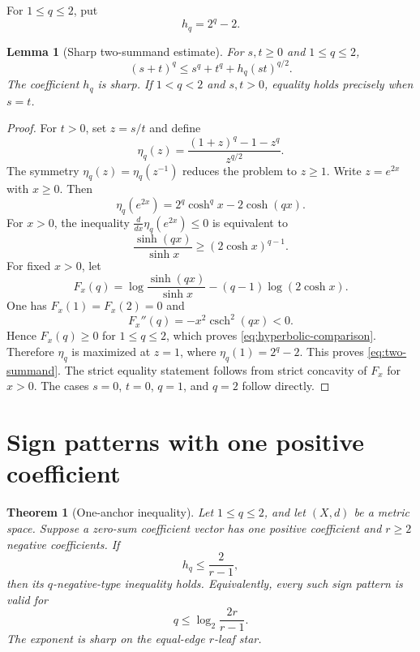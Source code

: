 \documentclass[11pt]{amsart}
\newtheorem{theorem}{Theorem}[section]
\newtheorem{lemma}[lemma]{Lemma}
\theoremstyle{definition}
\theoremstyle{remark}
\begin{document}
For $1\le q\le2$, put
\[
 h_q=2^q-2.
\]

\begin{lemma}[Sharp two-summand estimate]\label{lem:two-summand}
For $s,t\ge0$ and $1\le q\le2$,
\begin{equation}\label{eq:two-summand}
 (s+t)^q\le s^q+t^q+h_q(st)^{q/2}.
\end{equation}
The coefficient $h_q$ is sharp. If $1<q<2$ and $s,t>0$, equality holds precisely when $s=t$.
\end{lemma}

\begin{proof}
For $t>0$, set $z=s/t$ and define
\[
 \eta_q(z)=\frac{(1+z)^q-1-z^q}{z^{q/2}}.
\]
The symmetry $\eta_q(z)=\eta_q(z^{-1})$ reduces the problem to $z\ge1$. Write $z=e^{2x}$ with $x\ge0$. Then
\[
 \eta_q(e^{2x})=2^q\cosh^q x-2\cosh(qx).
\]
For $x>0$, the inequality $\frac{d}{dx}\eta_q(e^{2x})\le0$ is equivalent to
\begin{equation}\label{eq:hyperbolic-comparison}
 \frac{\sinh(qx)}{\sinh x}\ge(2\cosh x)^{q-1}.
\end{equation}
For fixed $x>0$, let
\[
 F_x(q)=\log\frac{\sinh(qx)}{\sinh x}-(q-1)\log(2\cosh x).
\]
One has $F_x(1)=F_x(2)=0$ and
\[
 F_x''(q)=-x^2\operatorname{csch}^2(qx)<0.
\]
Hence $F_x(q)\ge0$ for $1\le q\le2$, which proves \eqref{eq:hyperbolic-comparison}. Therefore $\eta_q$ is maximized at $z=1$, where $\eta_q(1)=2^q-2$. This proves \eqref{eq:two-summand}. The strict equality statement follows from strict concavity of $F_x$ for $x>0$. The cases $s=0$, $t=0$, $q=1$, and $q=2$ follow directly.
\end{proof}

\section{Sign patterns with one positive coefficient}

\begin{theorem}[One-anchor inequality]\label{thm:one-anchor}
Let $1\le q\le2$, and let $(X,d)$ be a metric space. Suppose a zero-sum coefficient vector has one positive coefficient and $r\ge2$ negative coefficients. If
\begin{equation}\label{eq:one-condition}
 h_q\le\frac{2}{r-1},
\end{equation}
then its $q$-negative-type inequality holds. Equivalently, every such sign pattern is valid for
\[
 q\le\log_2\frac{2r}{r-1}.
\]
The exponent is sharp on the equal-edge $r$-leaf star.
\end{theorem}
\end{document}
